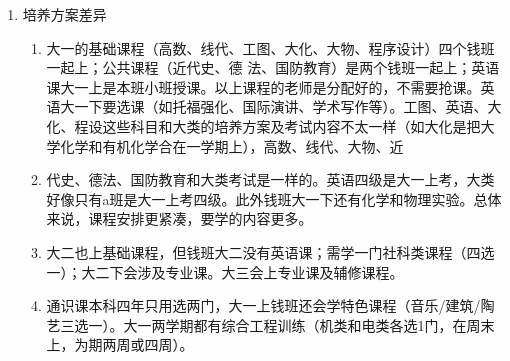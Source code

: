 \documentclass[zihao=-4,fontset=none]{Beautybook-CN}
\begin{document}
\begin{enumerate}
\begin{enumerate}
	      	\item 培养方案差异
	      	      \begin{enumerate}
	      	          \item 大一的基础课程（高数、线代、工图、大化、大物、程序设计）四个钱班一起上；公共课程（近代史、德 法、国防教育）是两个钱班一起上；英语课大一上是本班小班授课。以上课程的老师是分配好的，不需要抢课。英语大一下要选课（如托福强化、国际演讲、学术写作等）。工图、英语、大化、程设这些科目和大类的培养方案及考试内容不太一样（如大化是把大学化学和有机化学合在一学期上），高数、线代、大物、近
	      	      	      	      
	      	      \item 代史、德法、国防教育和大类考试是一样的。英语四级是大一上考，大类好像只有a班是大一上考四级。此外钱班大一下还有化学和物理实验。总体来说，课程安排更紧凑，要学的内容更多。
	      	      	      	      
	      	      \item 大二也上基础课程，但钱班大二没有英语课；需学一门社科类课程（四选一）；大二下会涉及专业课。大三会上专业课及辅修课程。
	      	      	      	      
	      	      \item 通识课本科四年只用选两门，大一上钱班还会学特色课程（音乐/建筑/陶艺三选一）。大一两学期都有综合工程训练（机类和电类各选1门，在周末上，为期两周或四周）。
	      	      \end{enumerate}	      	      	      	      
	      	      
	      \end{enumerate}
\end{enumerate}
\end{document}
